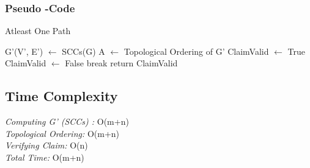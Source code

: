 \documentclass{article}
\begin{document}
\subsubsection{Pseudo -Code}
\begin{algorithm}
\caption{Atleast One Path}
\label{one}
\begin{algorithmic}[1]
\State G'(V', E') $\gets$ SCCs(G) 
\State A $\gets$ Topological Ordering of G' 
\State ClaimValid $\gets$ True
\State ClaimValid $\gets$ False
\State break
\EndIf
\EndFor {}
\State return ClaimValid
\EndProcedure
\end{algorithmic}
\end{algorithm}

\subsection{Time Complexity}
\emph{Computing G' (SCCs) : } O(m+n) \\
\emph{Topological Ordering: } O(m+n)\\
\emph{Verifying Claim:} O(n)\\
\emph{Total Time: }O(m+n)
\end{document}
